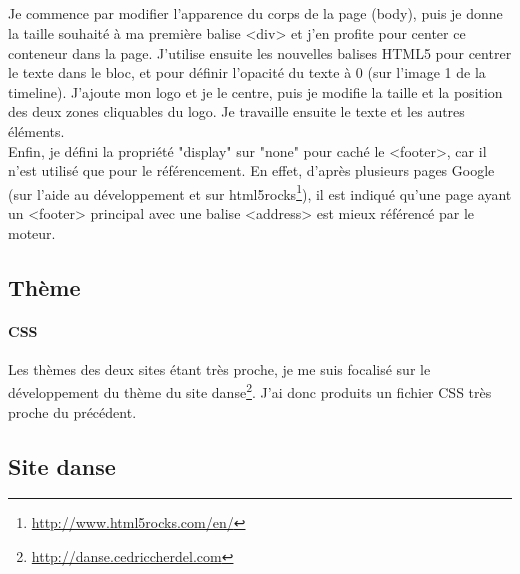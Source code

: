\documentclass[11pt,a4paper]{report}
\begin{document}
				\subparagraph*{}Je commence par modifier l'apparence du corps de la page (body), puis je donne la taille souhaité à ma première balise <div> et j'en profite pour center ce conteneur dans la page. J'utilise ensuite les nouvelles balises HTML5 pour centrer le texte dans le bloc, et pour définir l'opacité du texte à 0 (sur l'image 1 de la timeline). J'ajoute mon logo et je le centre, puis je modifie la taille et la position des deux zones cliquables du logo. Je travaille ensuite le texte et les autres éléments.\\
				Enfin, je défini la propriété "display" sur "none" pour caché le <footer>, car il n'est utilisé que pour le référencement. En effet, d'après plusieurs pages Google (sur l'aide au développement et sur html5rocks\footnote{\url{http://www.html5rocks.com/en/}}), il est indiqué qu'une page ayant un <footer> principal avec une balise <address> est mieux référencé par le moteur.
				\newpage

		\subsection{Thème}
			\paragraph{CSS}Les thèmes des deux sites étant très proche, je me suis focalisé sur le développement du thème du site danse\footnote{\url{http://danse.cedriccherdel.com}}. J'ai donc produits un fichier CSS très proche du précédent.

		\subsection{Site danse}
\end{document}

